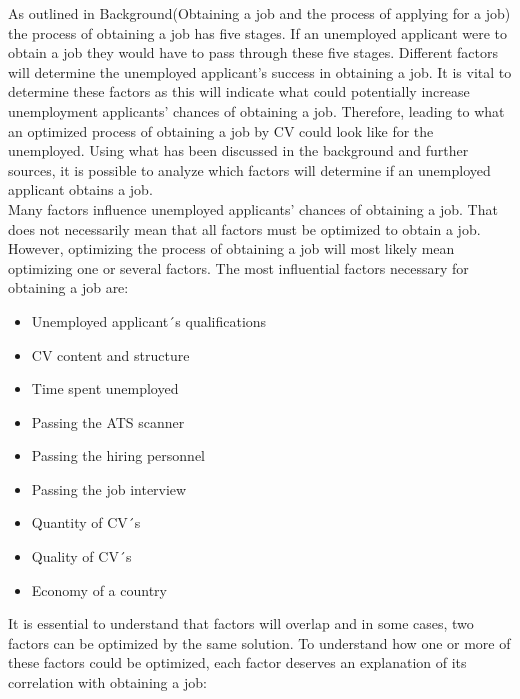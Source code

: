 As outlined in Background(Obtaining a job and the process of applying for a job) the process of obtaining a job has five stages.
If an unemployed applicant were to obtain a job they would have to pass through these five stages.
Different factors will determine the unemployed applicant's success in obtaining a job.
It is vital to determine these factors as this will indicate what could potentially increase unemployment applicants' chances of obtaining a job.
Therefore, leading to what an optimized process of obtaining a job by CV could look like for the unemployed.
Using what has been discussed in the background and further sources, it is possible to analyze which factors will determine if an unemployed applicant obtains a job. \\

Many factors influence unemployed applicants' chances of obtaining a job.
That does not necessarily mean that all factors must be optimized to obtain a job.
However, optimizing the process of obtaining a job will most likely mean optimizing one or several factors.
The most influential factors necessary for obtaining a job are: \\
\begin{itemize}
  \item  Unemployed applicant´s qualifications
  \item  CV content and structure
  \item  Time spent unemployed
  \item  Passing the ATS scanner
  \item  Passing the hiring personnel
  \item  Passing the job interview
  \item  Quantity of CV´s 
  \item  Quality of CV´s
  \item  Economy of a country
\end{itemize} 
It is essential to understand that factors will overlap and in some cases, two factors can be optimized by the same solution.
To understand how one or more of these factors could be optimized, each factor deserves an explanation of its correlation with obtaining a job: \\

